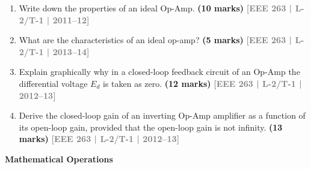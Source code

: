 \documentclass[12pt,a4paper]{article}
\newcommand{\yr}[1]{\hfill\textcolor{gray}{\small\textbf{[#1]}}}
\newcommand{\mk}[1]{\textcolor{orange!70!black}{\small\textbf{(#1 marks)}}}
\newcommand{\subtopic}[2]{%
  \vspace{10pt}
  \noindent\begin{tcolorbox}[colback=#1!8,colframe=#1,boxrule=0.6pt,arc=4pt,
    left=6pt,right=6pt,top=4pt,bottom=4pt]
    \small\bfseries\textcolor{#1}{#2}
  \end{tcolorbox}
  \vspace{2pt}
}
\begin{document}
\begin{enumerate}

\item Write down the properties of an ideal Op-Amp.
\mk{10} \yr{EEE 263 | L-2/T-1 | 2011--12}

\item What are the characteristics of an ideal op-amp?
\mk{5} \yr{EEE 263 | L-2/T-1 | 2013--14}

\item Explain graphically why in a closed-loop feedback circuit of an Op-Amp the differential voltage $E_d$ is taken as zero.
\mk{12} \yr{EEE 263 | L-2/T-1 | 2012--13}

\item Derive the closed-loop gain of an inverting Op-Amp amplifier as a function of its open-loop gain, provided that the open-loop gain is not infinity.
\mk{13} \yr{EEE 263 | L-2/T-1 | 2012--13}

\end{enumerate}

\subtopic{cE}{Mathematical Operations}
\label{sub:s7-math}
\end{document}
